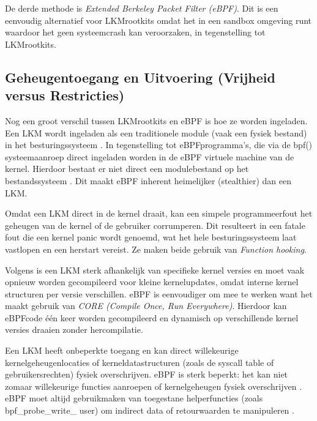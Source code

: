 De derde methode is \emph{Extended Berkeley Packet Filter (eBPF)}. Dit is een eenvoudig alternatief voor LKM\-rootkits omdat het in een sandbox omgeving runt waardoor het geen systeemcrash kan veroorzaken, in tegenstelling tot LKM\-rootkits. 

\subsection{Geheugentoegang en Uitvoering (Vrijheid versus Restricties)}
Nog een groot verschil tussen LKM\-rootkits en eBPF is hoe ze worden ingeladen. Een LKM wordt ingeladen als een traditionele module (vaak een fysiek bestand) in het besturingssysteem \autocite{Windshock2025}. In tegenstelling tot eBPF\-programma's, die via de bpf() systeemaanroep direct ingeladen worden in de eBPF virtuele machine van de kernel. Hierdoor bestaat er niet direct een module\-bestand op het bestandssysteem \autocite{Zaidenberg2024}. Dit maakt eBPF inherent heimelijker (stealthier) dan een LKM.

Omdat een LKM direct in de kernel draait, kan een simpele programmeerfout het geheugen van de kernel of de gebruiker corrumperen. Dit resulteert in een fatale fout die een kernel panic wordt genoemd, wat het hele besturingssysteem laat vastlopen en een herstart vereist. Ze maken beide gebruik van \emph{Function hooking}. 

Volgens \textcite{zacharia-mansouri-2026-NReUKT} is een LKM sterk afhankelijk van specifieke kernel versies en moet vaak opnieuw worden gecompileerd voor kleine kernel\-updates, omdat interne kernel structuren per versie verschillen. eBPF is eenvoudiger om mee te werken want het maakt gebruik van \emph{CO\-RE (Compile Once, Run Everywhere)}. Hierdoor kan eBPF\-code één keer worden gecompileerd en dynamisch op verschillende kernel versies draaien zonder hercompilatie. 

Een LKM heeft onbeperkte toegang en kan direct willekeurige kernelgeheugenlocaties of kernel\-datastructuren (zoals de syscall table of gebruikersrechten) fysiek overschrijven. eBPF is sterk beperkt: het kan niet zomaar willekeurige functies aanroepen of kernelgeheugen fysiek overschrijven \autocite{zacharia-mansouri-2026-NReUKT}. eBPF moet altijd gebruikmaken van toegestane helper\-functies (zoals bpf\_probe\_write\_ user) om indirect data of retourwaarden te manipuleren \autocite{Zaidenberg2024}.

